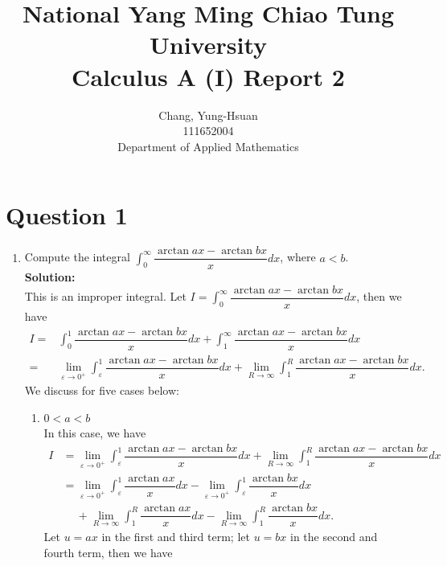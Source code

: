 \documentclass{article}
\begin{document}
\title{National Yang Ming Chiao Tung University\\Calculus A (I) Report 2}
\author{Chang, Yung-Hsuan\\111652004\\Department of Applied Mathematics}
\maketitle
\newpage

\section*{Question 1}
\begin{enumerate}[(1)]
    \item Compute the integral $\displaystyle\int_0^\infty{\dfrac{\arctan{ax}-\arctan{bx}}{x}dx}$, where $a<b$.\\
    \textbf{Solution:}\\
    This is an improper integral. Let $I=\displaystyle\int_0^\infty{\dfrac{\arctan{ax}-\arctan{bx}}{x}dx}$, then we have
    \begin{align*}
        I=&\int_0^1{\dfrac{\arctan{ax}-\arctan{bx}}{x}dx}+\int_1^\infty{\dfrac{\arctan{ax}-\arctan{bx}}{x}dx}\\
        =&\lim_{\varepsilon\to0^+}{\int_\varepsilon^1{\dfrac{\arctan{ax}-\arctan{bx}}{x}dx}}+\lim_{R\to\infty}{\int_1^R{\dfrac{\arctan{ax}-\arctan{bx}}{x}dx}}.
    \end{align*}
    We discuss for five cases below:
    \begin{enumerate}
        \item $0<a<b$\label{1.(a)}\\
        In this case, we have
        \begin{align*}
            I&=\lim_{\varepsilon\to0^+}{\int_\varepsilon^1{\dfrac{\arctan{ax}-\arctan{bx}}{x}dx}}+\lim_{R\to\infty}{\int_1^R{\dfrac{\arctan{ax}-\arctan{bx}}{x}dx}}\\
            &=\lim_{\varepsilon\to0^+}{\int_\varepsilon^1{\dfrac{\arctan{ax}}{x}dx}}-\lim_{\varepsilon\to0^+}{\int_\varepsilon^1{\dfrac{\arctan{bx}}{x}dx}}\\
            &\quad\:+\lim_{R\to\infty}{\int_1^R{\dfrac{\arctan{ax}}{x}dx}}-\lim_{R\to\infty}{\int_1^R{\dfrac{\arctan{bx}}{x}dx}}.
        \end{align*}
        Let $u=ax$ in the first and third term; let $u=bx$ in the second and fourth term, then we have
        \begin{align*}

\end{align*}
\end{enumerate}
\end{enumerate}
\end{document}
